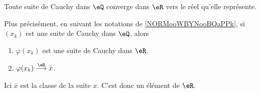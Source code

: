 \begin{lemma}      \label{LemooRTGFooYVstwS}
	Toute suite de Cauchy dans \( \eQ\) converge dans \( \eR\) vers le réel qu'elle représente.

	Plus précisément, en suivant les notations de \ref{NORMooWBYNooBQaPPk}, si \( (x_k)\) est une suite de Cauchy dans \( \eQ\), alors
	\begin{enumerate}
		\item
		      \( \varphi(x_k)\) est une suite de Cauchy dans \( \eR\).
		\item
		      \( \varphi(x_k)\stackrel{\eR}{\longrightarrow}\bar x\).
	\end{enumerate}
	Ici \( \bar x\) est la classe de la suite \( x\). C'est donc un élément de \( \eR\).
\end{lemma}

